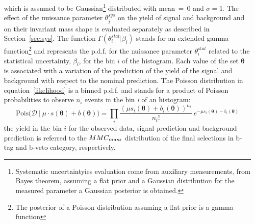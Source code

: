 which is assumed to be Gaussian\footnote{Systematic uncertaintyies evaluation  come from auxiliary measurements, from Bayes theorem,
	assuming a flat prior and a Gaussian distribution for the measured parameter  a Gaussian posterior is obtained.
				}
distributed with mean~=~0 and $\sigma = 1$.  The effect of the nuissance parameter $\theta_j^{sys}$ on the yield
of signal and background and on their invariant mass shape is evaluated separately as described in Section~\ref{sec:sys}.
The function  $\Gamma(\theta^{stat}_i | \beta_i)$ stands for an extended gamma function\footnote{The posterior of a
	Poisson distribution assuming a flat prior is a gamma function}
and 
represents the p.d.f. for the nuissance parameter $\theta^{stat}_i$ related 
to the statistical uncertainty, $ \beta_i$, for the bin $i$ of the histogram.
Each value of the set $\boldsymbol{\theta}$ is associated with a variation of the prediction of the yield of the signal and background
with respect to the nominal prediction.
The Poisson distribution in equation~\eqref{likelihood} is a binned p.d.f. and 
stands for a product of Poisson probabilities to observe $n_i$ events in the bin \textit{i} of an histogram:
$$
 \text{Pois(}\mathcal{D} ~ | ~ \mu \cdot s(\boldsymbol{\theta}) + b(\boldsymbol{\theta})) = \prod_{i} \frac{(\mu s_i(\boldsymbol{\theta}) +b_i(\boldsymbol{\theta}))^{n_i}}{n_i!} ~ e^{-\mu s_i(\boldsymbol{\theta})
 -b_i(\boldsymbol{\theta})}
$$
the yield in the bin $i$ for the observed data, signal prediction and background prediction is referred to the $MMC_{mass}$ 
distribution of the final selections in b-tag and b-veto category, respectively. 

